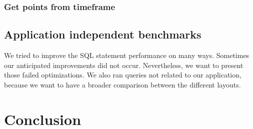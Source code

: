 \documentclass[10pt]{sig-alternate}
\begin{document}

\subsubsection{Get points from timeframe}

\subsection{Application independent benchmarks}
We tried to improve the SQL statement performance on many ways. Sometimes our anticipated improvements did not occur. Nevertheless, we want to present those failed optimizations. We also ran queries not related to our application, because we want to have a broader comparison between the different layouts.

\section{Conclusion}

% 


\end{document}
